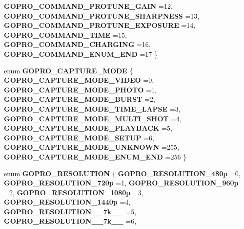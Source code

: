 \begin{DoxyCompactItemize}
\newline
\textbf{ G\+O\+P\+R\+O\+\_\+\+C\+O\+M\+M\+A\+N\+D\+\_\+\+P\+R\+O\+T\+U\+N\+E\+\_\+\+G\+A\+IN} =12, 
\textbf{ G\+O\+P\+R\+O\+\_\+\+C\+O\+M\+M\+A\+N\+D\+\_\+\+P\+R\+O\+T\+U\+N\+E\+\_\+\+S\+H\+A\+R\+P\+N\+E\+SS} =13, 
\textbf{ G\+O\+P\+R\+O\+\_\+\+C\+O\+M\+M\+A\+N\+D\+\_\+\+P\+R\+O\+T\+U\+N\+E\+\_\+\+E\+X\+P\+O\+S\+U\+RE} =14, 
\textbf{ G\+O\+P\+R\+O\+\_\+\+C\+O\+M\+M\+A\+N\+D\+\_\+\+T\+I\+ME} =15, 
\newline
\textbf{ G\+O\+P\+R\+O\+\_\+\+C\+O\+M\+M\+A\+N\+D\+\_\+\+C\+H\+A\+R\+G\+I\+NG} =16, 
\textbf{ G\+O\+P\+R\+O\+\_\+\+C\+O\+M\+M\+A\+N\+D\+\_\+\+E\+N\+U\+M\+\_\+\+E\+ND} =17
 \}
\item 
enum \textbf{ G\+O\+P\+R\+O\+\_\+\+C\+A\+P\+T\+U\+R\+E\+\_\+\+M\+O\+DE} \{ \newline
\textbf{ G\+O\+P\+R\+O\+\_\+\+C\+A\+P\+T\+U\+R\+E\+\_\+\+M\+O\+D\+E\+\_\+\+V\+I\+D\+EO} =0, 
\textbf{ G\+O\+P\+R\+O\+\_\+\+C\+A\+P\+T\+U\+R\+E\+\_\+\+M\+O\+D\+E\+\_\+\+P\+H\+O\+TO} =1, 
\textbf{ G\+O\+P\+R\+O\+\_\+\+C\+A\+P\+T\+U\+R\+E\+\_\+\+M\+O\+D\+E\+\_\+\+B\+U\+R\+ST} =2, 
\textbf{ G\+O\+P\+R\+O\+\_\+\+C\+A\+P\+T\+U\+R\+E\+\_\+\+M\+O\+D\+E\+\_\+\+T\+I\+M\+E\+\_\+\+L\+A\+P\+SE} =3, 
\newline
\textbf{ G\+O\+P\+R\+O\+\_\+\+C\+A\+P\+T\+U\+R\+E\+\_\+\+M\+O\+D\+E\+\_\+\+M\+U\+L\+T\+I\+\_\+\+S\+H\+OT} =4, 
\textbf{ G\+O\+P\+R\+O\+\_\+\+C\+A\+P\+T\+U\+R\+E\+\_\+\+M\+O\+D\+E\+\_\+\+P\+L\+A\+Y\+B\+A\+CK} =5, 
\textbf{ G\+O\+P\+R\+O\+\_\+\+C\+A\+P\+T\+U\+R\+E\+\_\+\+M\+O\+D\+E\+\_\+\+S\+E\+T\+UP} =6, 
\textbf{ G\+O\+P\+R\+O\+\_\+\+C\+A\+P\+T\+U\+R\+E\+\_\+\+M\+O\+D\+E\+\_\+\+U\+N\+K\+N\+O\+WN} =255, 
\newline
\textbf{ G\+O\+P\+R\+O\+\_\+\+C\+A\+P\+T\+U\+R\+E\+\_\+\+M\+O\+D\+E\+\_\+\+E\+N\+U\+M\+\_\+\+E\+ND} =256
 \}
\item 
enum \textbf{ G\+O\+P\+R\+O\+\_\+\+R\+E\+S\+O\+L\+U\+T\+I\+ON} \{ \newline
\textbf{ G\+O\+P\+R\+O\+\_\+\+R\+E\+S\+O\+L\+U\+T\+I\+O\+N\+\_\+480p} =0, 
\textbf{ G\+O\+P\+R\+O\+\_\+\+R\+E\+S\+O\+L\+U\+T\+I\+O\+N\+\_\+720p} =1, 
\textbf{ G\+O\+P\+R\+O\+\_\+\+R\+E\+S\+O\+L\+U\+T\+I\+O\+N\+\_\+960p} =2, 
\textbf{ G\+O\+P\+R\+O\+\_\+\+R\+E\+S\+O\+L\+U\+T\+I\+O\+N\+\_\+1080p} =3, 
\newline
\textbf{ G\+O\+P\+R\+O\+\_\+\+R\+E\+S\+O\+L\+U\+T\+I\+O\+N\+\_\+1440p} =4, 
\textbf{ G\+O\+P\+R\+O\+\_\+\+R\+E\+S\+O\+L\+U\+T\+I\+O\+N\+\_\+\_\+7k\+\_\+\_} =5, 
\textbf{ G\+O\+P\+R\+O\+\_\+\+R\+E\+S\+O\+L\+U\+T\+I\+O\+N\+\_\+\_\+7k\+\_\+\_} =6, 

\end{DoxyCompactItemize}
